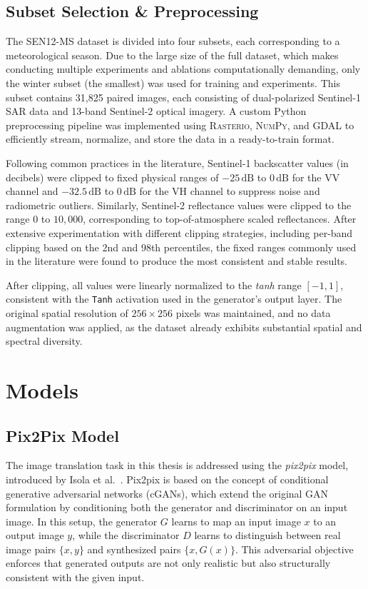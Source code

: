 \subsection{Subset Selection \& Preprocessing}
\label{subsec:preprocessing}
The SEN12-MS dataset is divided into four subsets, each corresponding to a meteorological season. Due to the large size of the full dataset, which makes conducting multiple experiments and ablations computationally demanding, only the winter subset (the smallest) was used for training and experiments. This subset contains 31,825 paired images, each consisting of dual-polarized Sentinel-1 SAR data and 13-band Sentinel-2 optical imagery. A custom Python preprocessing pipeline was implemented using \textsc{Rasterio}, \textsc{NumPy}, and \textsc{GDAL} to efficiently stream, normalize, and store the data in a ready-to-train format.  

Following common practices in the literature, Sentinel-1 backscatter values (in decibels) were clipped to fixed physical ranges of \(-25\,\text{dB}\) to \(0\,\text{dB}\) for the VV channel and \(-32.5\,\text{dB}\) to \(0\,\text{dB}\) for the VH channel to suppress noise and radiometric outliers. Similarly, Sentinel-2 reflectance values were clipped to the range \(0\) to \(10{,}000\), corresponding to top-of-atmosphere scaled reflectances. After extensive experimentation with different clipping strategies, including per-band clipping based on the 2nd and 98th percentiles, the fixed ranges commonly used in the literature were found to produce the most consistent and stable results. 

After clipping, all values were linearly normalized to the \textit{tanh} range \([-1, 1]\), consistent with the \texttt{Tanh} activation used in the generator’s output layer. The original spatial resolution of \(256 \times 256\) pixels was maintained, and no data augmentation was applied, as the dataset already exhibits substantial spatial and spectral diversity.

\section{Models}
\subsection{Pix2Pix Model}
The image translation task in this thesis is addressed using the \textit{pix2pix} model, introduced by Isola et al.~\cite{pix2pix_2018}. Pix2pix is based on the concept of conditional generative adversarial networks (cGANs), which extend the original GAN formulation by conditioning both the generator and discriminator on an input image. In this setup, the generator $G$ learns to map an input image $x$ to an output image $y$, while the discriminator $D$ learns to distinguish between real image pairs $\{x, y\}$ and synthesized pairs $\{x, G(x)\}$. This adversarial objective enforces that generated outputs are not only realistic but also structurally consistent with the given input.

